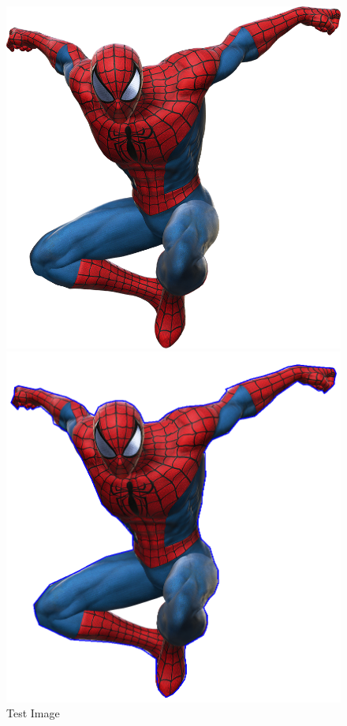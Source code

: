 \documentclass[conference]{IEEEtran}
\begin{document}
\begin{figure}
    \centering
    \includegraphics[scale=0.15]{spiderman.png}
    \caption{Test Image}
    \label{fig:testImage}
    \centering
    \includegraphics[scale=0.2]{spidermanEnclosed}

\end{figure}
\end{document}
